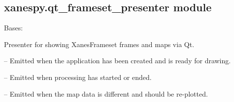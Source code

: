 \documentclass[letterpaper,10pt,english]{sphinxmanual}
\begin{document}
\subsection{xanespy.qt\_frameset\_presenter module}
\label{\detokenize{xanespy:xanespy-qt-frameset-presenter-module}}\label{\detokenize{xanespy:module-xanespy.qt_frameset_presenter}}

\begin{fulllineitems}
\label{\detokenize{xanespy:xanespy.qt_frameset_presenter.QtFramesetPresenter}}
Bases: 

Presenter for showing XanesFrameset frames and maps via Qt.

\begin{fulllineitems}
\label{\detokenize{xanespy:xanespy.qt_frameset_presenter.QtFramesetPresenter.app_ready}}
 -- Emitted when the application has been created and is ready for drawing.

\end{fulllineitems}


\begin{fulllineitems}
\label{\detokenize{xanespy:xanespy.qt_frameset_presenter.QtFramesetPresenter.busy_status_changed}}
 -- Emitted when processing has started or ended.

\end{fulllineitems}


\begin{fulllineitems}
\label{\detokenize{xanespy:xanespy.qt_frameset_presenter.QtFramesetPresenter.map_data_changed}}
 -- Emitted when the map data is different and should be re-plotted.


\end{fulllineitems}
\end{fulllineitems}
\end{document}
